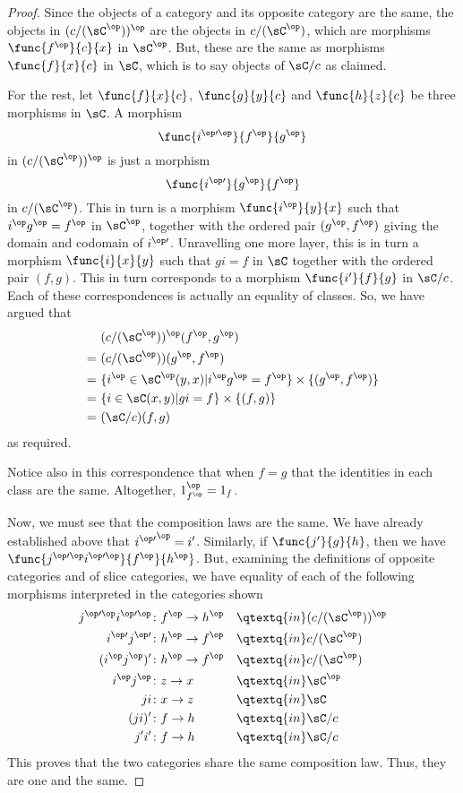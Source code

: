 \documentclass[main.tex]{subfiles}
\begin{document}
\begin{proof}
	Since the objects of a category and its opposite category are the same, the
	objects in \((c/(\sC^\op))^\op\) are the objects in \(c/(\sC^\op)\), which
	are morphisms \(\func{f^\op}{c}{x}\) in \(\sC^\op\). But, these are the same
	as morphisms \(\func{f}{x}{c}\) in \(\sC\), which is to say objects of
	\(\sC/c\) as claimed.

	For the rest, let \(\func{f}{x}{c}\), \(\func{g}{y}{c}\) and
	\(\func{h}{z}{c}\) be three morphisms in \(\sC\). A morphism
	\[\func{i^{\op\prime\op}}{f^\op}{g^\op}\] in \((c/(\sC^\op))^\op\) is just a
	morphism \[\func{i^{\op\prime}}{g^\op}{f^\op}\] in \(c/(\sC^\op)\). This in
	turn is a morphism \(\func{i^\op}{y}{x}\) such that \(i^\op g^\op=f^\op\) in
	\(\sC^\op\), together with the ordered pair \((g^\op,f^\op)\) giving the
	domain and codomain of \(i^{\op\prime}\). Unravelling one more layer, this
	is in turn a morphism \(\func{i}{x}{y}\) such that \(gi=f\) in \(\sC\)
	together with the ordered pair \((f,g)\). This in turn corresponds to a
	morphism \(\func{i'}{f}{g}\) in \(\sC/c\). Each of these correspondences is
	actually an equality of classes. So, we have argued that
	\begin{align*}
		&(c/(\sC^\op))^\op(f^\op, g^\op)\\
		=\ &(c/(\sC^\op))(g^\op, f^\op)\\
		=\ &\{i^\op\in\sC^\op(y,x)|i^\op g^\op=f^\op\}\times\{(g^\op,f^\op)\}\\
		=\ &\{i\in\sC(x,y)|gi=f\}\times\{(f,g)\}\\
		=\ &(\sC/c)(f,g)\\
	\end{align*}
		as required.

	Notice also in this correspondence that when \(f=g\) that the identities in
	each class are the same. Altogether, \(1_{f^\op}^\op=1_f\).

	Now, we must see that the composition laws are the same. We have already
	established above that \({i^{\op\prime}}^\op=i'\). Similarly, if
	\(\func{j'}{g}{h}\), then we have
	\(\func{j^{\op\prime\op}i^{\op\prime\op}}{f^\op}{h^\op}\). But, examining
	the definitions of opposite categories and of slice categories, we have
	equality of each of the following morphisms interpreted in the categories
	shown
	\begin{alignat*}{2}
		j^{\op\prime\op}i^{\op\prime\op}\colon&f^\op\to h^\op&&
		\qtextq{ in }(c/(\sC^\op))^\op\\
		i^{\op\prime}j^{\op\prime}\colon&h^\op\to f^\op&&
		\qtextq{ in }c/(\sC^\op)\\
		(i^\op j^\op)'\colon&h^\op\to f^\op&&
		\qtextq{ in }c/(\sC^\op)\\
		i^\op j^\op\colon&z\to x&&\qtextq{ in }\sC^\op\\
		ji\colon&x\to z&&\qtextq{ in }\sC\\
		(ji)'\colon&f\to h&&\qtextq{ in }\sC/c\\
		j' i'\colon&f\to h&&\qtextq{ in }\sC/c
	\end{alignat*} This proves that the two
	categories share the same composition law. Thus, they are one and the same.


\end{proof}
\end{document}
